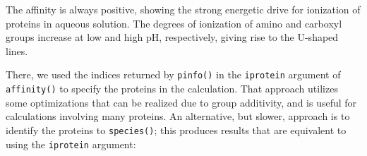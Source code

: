 \documentclass[]{tufte-book}
\newenvironment{Shaded}{}{}
\newcommand{\KeywordTok}[1]{\textcolor[rgb]{0.00,0.44,0.13}{\textbf{#1}}}
\newcommand{\DataTypeTok}[1]{\textcolor[rgb]{0.56,0.13,0.00}{#1}}
\newcommand{\DecValTok}[1]{\textcolor[rgb]{0.25,0.63,0.44}{#1}}
\newcommand{\FloatTok}[1]{\textcolor[rgb]{0.25,0.63,0.44}{#1}}
\newcommand{\StringTok}[1]{\textcolor[rgb]{0.25,0.44,0.63}{#1}}
\newcommand{\ControlFlowTok}[1]{\textcolor[rgb]{0.00,0.44,0.13}{\textbf{#1}}}
\newcommand{\OperatorTok}[1]{\textcolor[rgb]{0.40,0.40,0.40}{#1}}
\newcommand{\NormalTok}[1]{#1}
\begin{document}
\begin{Shaded}
\end{Shaded}

The affinity is always positive, showing the strong energetic drive for
ionization of proteins in aqueous solution. The degrees of ionization of
amino and carboxyl groups increase at low and high pH, respectively,
giving rise to the U-shaped lines.

There, we used the indices returned by {\texttt{pinfo()}} in the
\texttt{iprotein} argument of {\texttt{affinity()}} to specify the
proteins in the calculation. That approach utilizes some optimizations
that can be realized due to group additivity, and is useful for
calculations involving many proteins. An alternative, but slower,
approach is to identify the proteins to {\texttt{species()}}; this
produces results that are equivalent to using the \texttt{iprotein}
argument:
\end{document}
